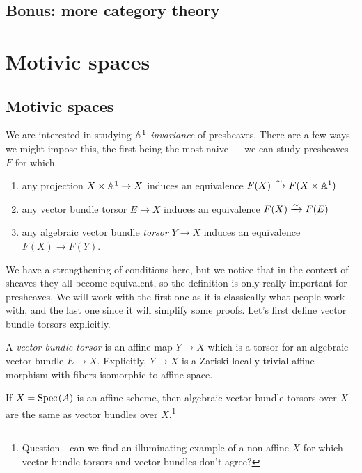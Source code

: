 \documentclass[11pt,openany]{book}
\begin{document}
\section{Bonus: more category theory}




\chapter{Motivic spaces}
\minitoc
\section{Motivic spaces}

We are interested in studying \textit{$\mathbb{A}^1$-invariance} of presheaves. There are a few ways we might impose this, the first being the most naive --- we can study presheaves $F$ for which
\begin{enumerate}
    \item any projection $X \times \mathbb{A}^1 \to X$ induces an equivalence $F(X) \xrightarrow{\sim} F(X \times \mathbb{A}^1)$
    \item any  vector bundle torsor $E \to X$ induces an equivalence $F(X) \xrightarrow{\sim} F(E)$
    \item any algebraic vector bundle \textit{torsor} $Y \to X$ induces an equivalence $F(X) \to F(Y)$.
\end{enumerate}
We have a strengthening of conditions here, but we notice that in the context of sheaves they all become equivalent, so the definition is only really important for presheaves. We will work with the first one as it is classically what people work with, and the last one since it will simplify some proofs. Let's first define vector bundle torsors explicitly.

\begin{definition} \cite[4.2]{Weibel-KH}
A \textit{vector bundle torsor} is an affine map $Y \to X$ which is a torsor for an algebraic vector bundle $E \to X$. Explicitly, $Y \to X$ is a Zariski locally trivial affine morphism with fibers isomorphic to affine space.
\end{definition}

\begin{example} If $X = \text{Spec}\hspace{0.1em}(A)$ is an affine scheme, then algebraic vector bundle torsors over $X$ are the same as vector bundles over $X$.\footnote{%
Question - can we find an illuminating example of a non-affine $X$ for which vector bundle torsors and vector bundles don't agree?}
\end{example}
\end{document}
